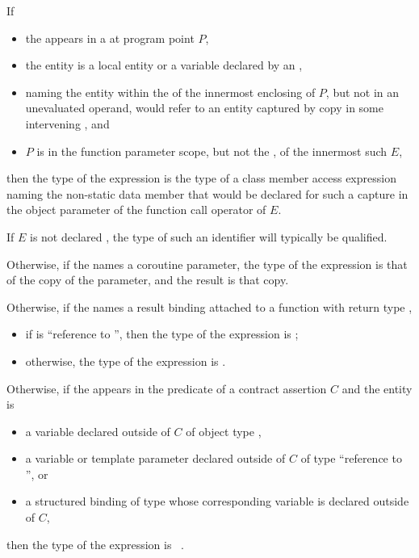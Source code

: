 \pnum
If
\begin{itemize}
\item
the 
appears in a 
at program point $P$,
\item
the entity is a local entity
or a variable declared by an ,
\item
naming the entity within the  of
the innermost enclosing  of $P$,
but not in an unevaluated operand, would refer to an entity captured by copy
in some intervening , and
\item
$P$ is in the function parameter scope,
but not the ,
of the innermost such  $E$,
\end{itemize}
then
the type of the expression is
the type of a class member access expression
naming the non-static data member
that would be declared for such a capture
in the object parameter of the function call operator of $E$.
\begin{note}
If $E$ is not declared ,
the type of such an identifier will typically be  qualified.
\end{note}

\pnum
Otherwise,
if the 
names a coroutine parameter,
the type of the expression is
that of the copy of the parameter,
and the result is that copy.

\pnum
Otherwise,
if the 
names a result binding
attached to a function 
with return type ,
\begin{itemize}
\item
if  is ``reference to '',
then the type of the expression is
;
\item
otherwise,
the type of the expression is .
\end{itemize}

\pnum
Otherwise,
if the 
appears in the predicate of a contract assertion $C$
and the entity is
\begin{itemize}
\item
a variable
declared outside of $C$
of object type ,
\item
a variable or template parameter
declared outside of $C$
of type ``reference to '', or
\item
a structured binding
of type 
whose corresponding variable
is declared outside of $C$,
\end{itemize}
then the type of the expression is ~.

